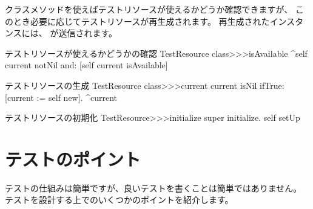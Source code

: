 \documentclass[a4paper,10pt,twoside]{book}
\begin{document}
 クラスメソッドを使えばテストリソースが使えるかどうか確認できますが、
このとき必要に応じてテストリソースが再生成されます。
再生成されたインスタンスには、 が送信されます。


\begin{method}[testresourceisavailable]{テストリソースが使えるかどうかの確認}
TestResource class>>>isAvailable
	^self current notNil and: [self current isAvailable]
\end{method}
\begin{method}[testresourcecurrent]{テストリソースの生成}
TestResource class>>>current
	current isNil ifTrue: [current := self new].
	^current
\end{method}
\begin{method}[restresourceinitialize]{テストリソースの初期化}
TestResource>>>initialize
	super initialize.
	self setUp
\end{method}
\section{テストのポイント}

テストの仕組みは簡単ですが、良いテストを書くことは簡単ではありません。
テストを設計する上でのいくつかのポイントを紹介します。
\end{document}
